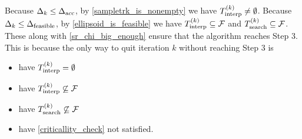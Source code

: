 % 




\color{red}
Because $\Delta_k \le {\Delta_{\textrm{acc}}}$, by \cref{sampletrk_is_nonempty} we have ${T_{\text{interp}}^{(k)}} \ne \emptyset$.
Because $\Delta_k \le {\Delta_{\textrm{feasible}}}$, by \cref{ellipsoid_is_feasible} we have ${T_{\text{interp}}^{(k)}} \subseteq {\mathcal F}$ and ${T_{\text{search}}^{(k)}} \subseteq {\mathcal F}$.
These along with \cref{sr_chi_big_enough} ensure that the algorithm reaches Step 3.
This is because the only way to quit iteration $k$ without reaching Step 3 is
\begin{itemize}
\item have ${T_{\text{interp}}^{(k)}} = \emptyset$
\item have ${T_{\text{interp}}^{(k)}} \not \subseteq {\mathcal F}$
\item have ${T_{\text{search}}^{(k)}} \not \subseteq {\mathcal F}$
\item have \cref{criticallity_check} not satisfied.
\end{itemize}
\color{black}



